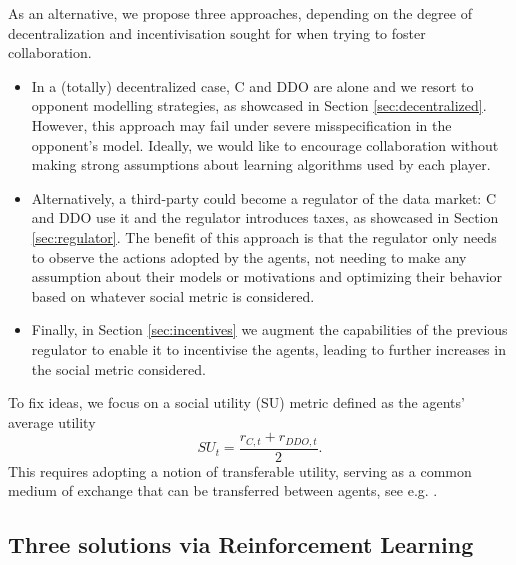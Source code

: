 As an alternative,  we propose three approaches, depending on the degree of decentralization and incentivisation sought for when trying 
to foster collaboration. 
\begin{itemize}
        \item In a (totally) decentralized case, C and DDO are alone and we resort to opponent modelling strategies,
        as showcased in Section \ref{sec:decentralized}. However, 
        this approach may fail under severe misspecification in the opponent's model. Ideally, we would
        like to encourage collaboration without making strong assumptions about learning algorithms used by each player. 
      
        \item Alternatively, a third-party could become a regulator of the data market: C and DDO use it and  
        the regulator introduces taxes, as showcased 
        in Section \ref{sec:regulator}. 
        The benefit of this approach is that the regulator only needs to observe the actions adopted by the agents, not needing to make any assumption about their models or motivations and optimizing their behavior based on whatever social metric is considered.
        
        \item Finally, in Section \ref{sec:incentives} we augment the capabilities of the previous regulator to enable it to  incentivise the agents, leading to further increases in the social metric considered.
    \end{itemize}

\noindent To fix ideas, we focus on a social utility (SU) metric
defined as the agents' average utility  
\begin{equation}\label{eq:su}
SU_t = \frac{r_{C,t} + r_{DDO,t}}{2}.
\end{equation}
This requires adopting a notion of transferable utility,
serving as a common medium of exchange that can be transferred between agents, see e.g. \cite{aumann1960}.



\subsection{Three solutions via Reinforcement Learning}\label{sec:sols}


